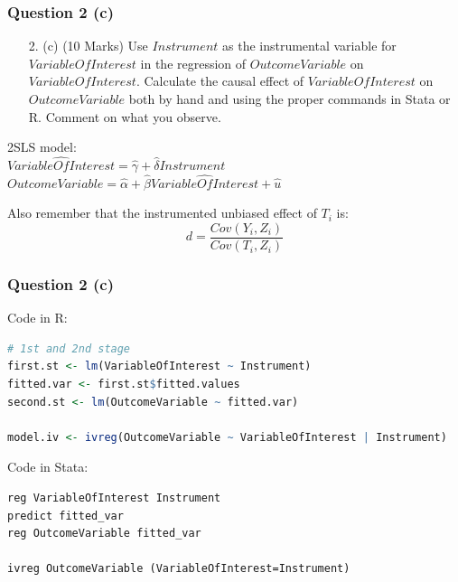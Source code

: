 \documentclass[xcolor=table,dvipsnames]{beamer}
\begin{document}
\begin{frame}
\frametitle{Question 2 (c)}
\begin{enumerate}
\item[2.] (c) (10 Marks) Use $Instrument$ as the instrumental variable for $VariableOfInterest$ in the regression of $OutcomeVariable$ on $VariableOfInterest$. Calculate the causal effect of $VariableOfInterest$ on $OutcomeVariable$ both by hand and using the proper commands in Stata or R. Comment on what you observe.
\end{enumerate} \pause

2SLS model: \pause \\
$\widehat{VariableOfInterest} = \hat{\gamma} + \hat{\delta} Instrument$ \pause
$OutcomeVariable = \hat{\alpha} + \hat{\beta} \widehat{VariableOfInterest} + \hat{u}$ \pause

Also remember that the instrumented unbiased effect of $T_i$ is: \pause
$$d=\frac{Cov(Y_i,Z_i)}{Cov(T_i,Z_i)} $$
\end{frame}

\begin{frame}[fragile]
\frametitle{Question 2 (c)}
Code in R:
\begin{lstlisting}[language=R]
# 1st and 2nd stage
first.st <- lm(VariableOfInterest ~ Instrument)
fitted.var <- first.st$fitted.values
second.st <- lm(OutcomeVariable ~ fitted.var)

model.iv <- ivreg(OutcomeVariable ~ VariableOfInterest | Instrument)
\end{lstlisting} \pause

Code in Stata:
\begin{lstlisting}
reg VariableOfInterest Instrument
predict fitted_var
reg OutcomeVariable fitted_var

ivreg OutcomeVariable (VariableOfInterest=Instrument)
\end{lstlisting}
\end{frame}
\end{document}
